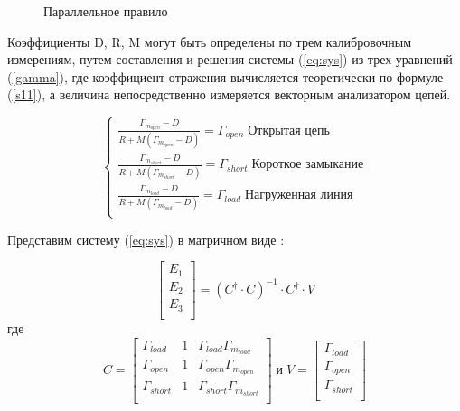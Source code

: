 \documentclass[a4paper]{article}
\begin{document}
\begin{figure}[H]
\begin{center}
\begin{minipage}[H]{0.45\linewidth}
            \caption{Параллельное правило \cite{Walker}}
            \label{fig:parallel-rule}
        \end{minipage}
    \end{center}
\end{figure}

Коэффициенты D, R, M могут быть определены по трем калибровочным измерениям, путем составления и решения системы (\ref{eq:sys}) из трех уравнений (\ref{gamma}), где коэффициент отражения  вычисляется теоретически по формуле (\ref{s11}), а величина  непосредственно измеряется векторным анализатором цепей.

\begin{equation}
    \begin{cases}
        \frac{\Gamma_{m_{open}} - D}{R + M(\Gamma_{m_{open}} - D)} = \Gamma_{open} \; \text{Открытая цепь} \\
        \frac{\Gamma_{m_{short}} - D}{R + M(\Gamma_{m_{short}} - D)} = \Gamma_{short} \; \text{Короткое замыкание}\\
        \frac{\Gamma_{m_{load}} - D}{R + M(\Gamma_{m_{load}} - D)} = \Gamma_{load} \; \text{Нагруженная линия} \\
    \end{cases}
    \label{eq:sys}
\end{equation}

Представим систему (\ref{eq:sys}) в матричном виде \cite{Walker}:

\begin{equation}
    \begin{bmatrix}
        E_1\\
        E_2\\
        E_3\\
    \end{bmatrix}
    =
    \left( C^{\dag}  \cdot C \right)^{-1} \cdot C^{\dag} \cdot V
\end{equation}
где
\begin{equation}
    C = 
    \begin{bmatrix}
        \Gamma_{load} & 1 & \Gamma_{load} \Gamma_{m_{load}} \\ 
        \Gamma_{open} & 1 & \Gamma_{open} \Gamma_{m_{open}} \\ 
        \Gamma_{short} & 1 & \Gamma_{short} \Gamma_{m_{short}} \\ 
    \end{bmatrix}
    \;
    \text{и}
    \;
    V = 
    \begin{bmatrix}
        \Gamma_{load} \\ 
        \Gamma_{open} \\ 
        \Gamma_{short} \\ 
    \end{bmatrix}
\end{equation}
\end{document}
